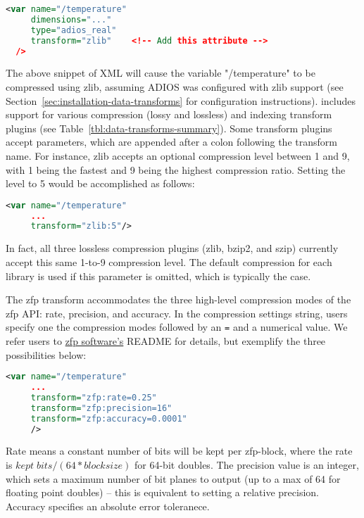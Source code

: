 \begin{lstlisting}[language=XML]
<var name="/temperature"
     dimensions="..."
     type="adios_real"
     transform="zlib"    <!-- Add this attribute -->
  />
\end{lstlisting}

The above snippet of XML will cause the variable "/temperature" to be compressed using zlib, assuming ADIOS was configured with zlib support
(see Section~\ref{sec:installation-data-transforms} for configuration instructions). \adiosversion includes support for 
various compression (lossy and lossless) and indexing transform plugins (see Table~\ref{tbl:data-transforms-summary}).
Some transform plugins accept parameters, which are appended after a colon following the transform name.
For instance, zlib accepts an optional compression level between 1 and 9, with 1 being the fastest and
9 being the highest compression ratio. Setting the level to 5 would be accomplished as follows:

\begin{lstlisting}[language=XML]
<var name="/temperature"
     ...
     transform="zlib:5"/>
\end{lstlisting}

In fact, all three lossless compression plugins (zlib, bzip2, and szip) currently accept this same
1-to-9 compression level. The default compression for each library is used if this parameter is
omitted, which is typically the case.

The zfp transform accommodates the three high-level compression modes of the zfp API: rate, precision, and accuracy.
In the compression settings string, users specify one the compression modes followed by an \texttt{=} and a numerical value.
We refer users to \href{http://computation.llnl.gov/projects/floating-point-compression}{zfp software's} README for details,
but exemplify the three possibilities below:
\begin{lstlisting}[language=XML]
<var name="/temperature"
     ...
     transform="zfp:rate=0.25"
     transform="zfp:precision=16"
     transform="zfp:accuracy=0.0001"
     />
\end{lstlisting}
Rate means a constant number of bits will be kept per zfp-block, where the rate is $ kept \; bits/ (64*blocksize)$ for 64-bit doubles.
The precision value is an integer, which sets a maximum number of bit planes to output (up to a max of 64 for floating point doubles) -- 
this is equivalent to setting a relative precision.
Accuracy specifies an absolute error toleranece.


